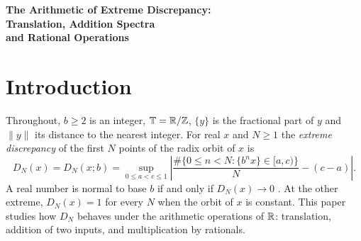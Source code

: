 \documentclass[11pt]{article}
\newcommand{\dist}[1]{\lVert #1\rVert}
\newcommand{\fr}[1]{\{#1\}}
\begin{document}
\begin{center}
{\LARGE\bfseries The Arithmetic of Extreme Discrepancy:\\[3pt] Translation, Addition Spectra\\[3pt] and Rational Operations\par}
\vspace{10pt}
\end{center}

\begin{abstract}
For an integer base $b\ge2$ let $D_N(x)$ be the extreme discrepancy of $x,bx,\ldots,b^{N-1}x$ modulo
one. We prove the finite identity $\sup_x|D_N(x+z)-D_N(x)|=1-D_N(z)$, attained at $x=0$, and
classify the translations that preserve both limiting discrepancies of every real number: they
are the numbers $c+w$ with $(b-1)c\in\Z$ and $N^{-1}\sum_{n<N}\dist{b^nw}\to0$. The limits of
$D_N(x)$, $D_N(y)$ and $D_N(x+y)$ are exactly the triples in $[0,1]^3$ with
$\max(0,\alpha+\beta-1)\le\gamma\le1-|\alpha-\beta|$. Every such triple is realized by positive
rational expansions on a cubic schedule with simultaneous error $O(N^{-1/3})$, uniformly in the
triple, by computable and algebraically independent witnesses; the analogous deficit polytope for
$d$ summands is determined. The translation deficit $1-D_N(x-y)$ is a pseudometric, an exact form
of L\'evy's concentration function comparable to the Ky Fan distance to constants. The rational
scalars preserving its asymptotic kernel are exactly $\Z[1/b]$, an individual rational scaling is
decided by a residue-density test, and on the boundary $D_N(mx)\to1$ the attainable limits of
$D_N(x)$ form $[1/m_0,1]$, where $m_0$ is the part of $m$ prime to $b$. The finite identity, the
pseudometric axioms and the qualitative addition spectrum are verified by the Lean~4 kernel.
\end{abstract}

\section{Introduction}\label{sec:intro}

Throughout, $b\ge2$ is an integer, $\mathbb T=\mathbb R/\mathbb Z$, $\fr{y}$ is the fractional part of $y$ and
$\dist{y}$ its distance to the nearest integer. For real $x$ and $N\ge1$ the \emph{extreme
discrepancy} of the first $N$ points of the radix orbit of $x$ is
\[
D_N(x)=D_N(x;b)=\sup_{0\le a<c\le1}\left|\frac{\#\{0\le n<N:\fr{b^nx}\in[a,c)\}}{N}-(c-a)\right|.
\]
A real number is normal to base $b$ if and only if $D_N(x)\to0$ \cite[Chapter~1, Theorem~8.1,
p.~70, and Chapter~2, Theorem~1.1, p.~89]{KN}. At the other extreme, $D_N(x)=1$ for every $N$ when
the orbit of $x$ is constant. This paper studies how $D_N$ behaves under the arithmetic operations
of $\mathbb R$: translation, addition of two inputs, and multiplication by rationals.
\end{document}
